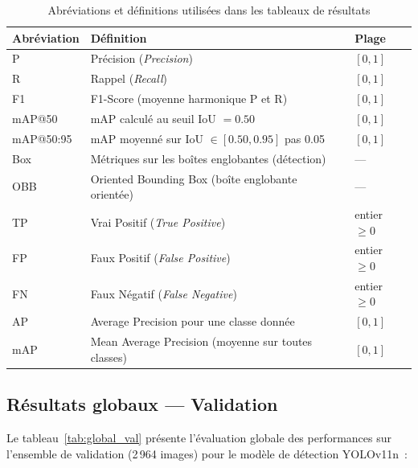 \begin{table}[H]
\centering
\caption{Abréviations et définitions utilisées dans les tableaux de résultats}
\label{tab:abrev}
\begin{tabular}{lll}
\toprule
\textbf{Abréviation} & \textbf{Définition} & \textbf{Plage} \\
\midrule
P          & Précision (\textit{Precision})                        & $[0, 1]$ \\
R          & Rappel (\textit{Recall})                              & $[0, 1]$ \\
F1         & F1-Score (moyenne harmonique P et R)                  & $[0, 1]$ \\
mAP@50     & mAP calculé au seuil IoU $= 0.50$                    & $[0, 1]$ \\
mAP@50:95  & mAP moyenné sur IoU $\in [0.50, 0.95]$ pas 0.05      & $[0, 1]$ \\
Box        & Métriques sur les boîtes englobantes (détection)      & --- \\
OBB        & Oriented Bounding Box (boîte englobante orientée)     & --- \\
TP         & Vrai Positif (\textit{True Positive})                 & entier $\geq 0$ \\
FP         & Faux Positif (\textit{False Positive})                & entier $\geq 0$ \\
FN         & Faux Négatif (\textit{False Negative})                & entier $\geq 0$ \\
AP         & Average Precision pour une classe donnée              & $[0, 1]$ \\
mAP        & Mean Average Precision (moyenne sur toutes classes)   & $[0, 1]$ \\
\bottomrule
\end{tabular}
\end{table}

\subsection{Résultats globaux --- Validation}
\label{subsec:global_val}

Le tableau~\ref{tab:global_val} présente l'évaluation globale des performances
sur l'ensemble de validation (2\,964 images) pour le modèle de détection YOLOv11n~:

